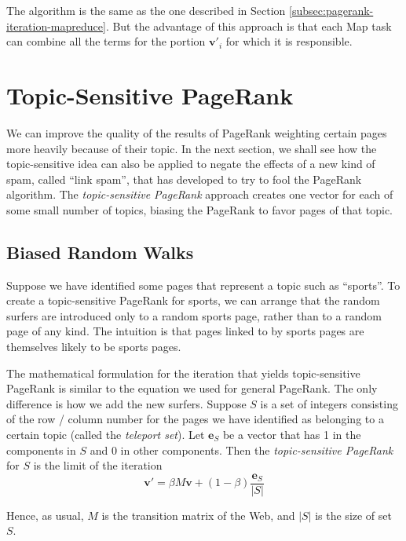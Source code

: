 The algorithm is the same as the one described in Section \ref{subsec:pagerank-iteration-mapreduce}. But the advantage of this approach is that each Map task can combine all the terms for the portion $\textbf{v}'_i$ for which it is responsible.

\section{Topic-Sensitive PageRank}\label{sec:topic-sensitive-pagerank}

We can improve the quality of the results of PageRank weighting certain pages more heavily because of their topic. In the next section, we shall see how the topic-sensitive idea can also be applied to negate the effects of a new kind of spam, called ``link spam'', that has developed to try to fool the PageRank algorithm. The \textit{topic-sensitive PageRank} approach creates one vector for each of some small number of topics, biasing the PageRank to favor pages of that topic.       

\subsection{Biased Random Walks}\label{subsec:biased-random-walks}

Suppose we have identified some pages that represent a topic such as ``sports''. To create a topic-sensitive PageRank for sports, we can arrange that the random surfers are introduced only to a random sports page, rather than to a random page of any kind. The intuition is that pages linked to by sports pages are themselves likely to be sports pages.

The mathematical formulation for the iteration that yields topic-sensitive PageRank is similar to the equation we used for general PageRank. The only difference is how we add the new surfers. Suppose $S$ is a set of integers consisting of the row / column number for the pages we have identified as belonging to a certain topic (called the \textit{teleport set}). Let $\textbf{e}_S$ be a vector that has 1 in the components in $S$ and $0$ in other components. Then the \textit{topic-sensitive PageRank} for $S$ is the limit of the iteration
\begin{equation*}\label{eq:topic-sensitive-pagerank}
    \textbf{v}' = \beta M \textbf{v} + (1 - \beta) \frac{\textbf{e}_S}{|S|}
\end{equation*}

Hence, as usual, $M$ is the transition matrix of the Web, and $|S|$ is the size of set $S$.

